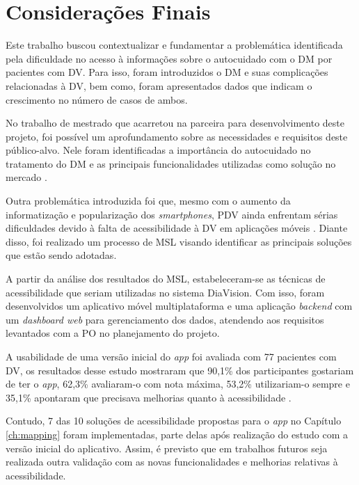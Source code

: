 \chapter{Considerações Finais}
\label{ch:conclusion}

Este trabalho buscou contextualizar e fundamentar a problemática identificada pela dificuldade
no acesso à informações sobre o autocuidado com o DM por pacientes com DV\@. Para isso, foram introduzidos
o DM e suas complicações relacionadas à DV, bem como, foram apresentados dados que indicam o crescimento no
número de casos de ambos.

No trabalho de mestrado que acarretou na parceira para desenvolvimento deste projeto, foi possível um aprofundamento
sobre as necessidades e requisitos deste público-alvo. Nele foram identificadas a importância do autocuidado
no tratamento do DM e as principais funcionalidades utilizadas como solução no mercado \cite{Sobral2021}.

Outra problemática introduzida foi que, mesmo com o aumento da informatização e popularização dos \emph{smartphones},
PDV ainda enfrentam sérias dificuldades devido à falta de acessibilidade à DV em aplicações móveis \cite{Shera2021285}.
Diante disso, foi realizado um processo de MSL visando identificar as principais soluções que estão sendo adotadas.

A partir da análise dos resultados do MSL, estabeleceram-se as técnicas de acessibilidade que seriam utilizadas
no sistema DiaVision. Com isso, foram desenvolvidos um aplicativo móvel multiplataforma e uma aplicação
\emph{backend} com um \emph{dashboard web} para gerenciamento dos dados, atendendo aos requisitos levantados
com a PO no planejamento do projeto.

A usabilidade de uma versão inicial do \emph{app} foi avaliada com 77 pacientes com DV, os resultados
desse estudo mostraram que 90,1\% dos participantes gostariam de ter o \emph{app}, 62,3\% avaliaram-o com nota
máxima, 53,2\% utilizariam-o sempre e 35,1\% apontaram que precisava melhorias quanto à acessibilidade \cite{Sobral2022}.

Contudo, 7 das 10 soluções de acessibilidade propostas para o \emph{app} no Capítulo \ref{ch:mapping} foram implementadas,
parte delas após realização do estudo com a versão inicial do aplicativo. Assim, é previsto que em trabalhos futuros
seja realizada outra validação com as novas funcionalidades e melhorias relativas à acessibilidade.